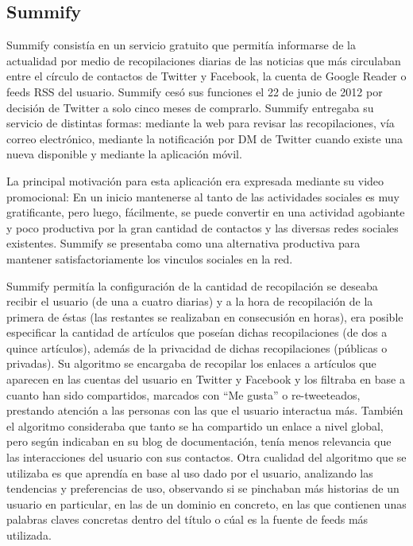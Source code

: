 \subsection{Summify}

Summify\cite{summify} consistía en un servicio gratuito que permitía informarse de la actualidad por medio de recopilaciones diarias de las noticias que más circulaban entre el círculo de contactos de Twitter y Facebook, la cuenta de Google Reader o feeds RSS del usuario. Summify cesó sus funciones el 22 de junio de 2012 por decisión de Twitter a solo cinco meses de comprarlo. Summify entregaba su servicio de distintas formas: mediante la web para revisar las recopilaciones, vía correo electrónico, mediante la notificación por DM de Twitter cuando existe una nueva disponible y mediante la aplicación móvil.

La principal motivación para esta aplicación era expresada mediante su video promocional: En un inicio mantenerse al tanto de las actividades sociales es muy gratificante, pero luego, fácilmente, se puede convertir en una actividad agobiante y poco productiva por la gran cantidad de contactos y las diversas redes sociales existentes. Summify se presentaba como una alternativa productiva para mantener satisfactoriamente los vinculos sociales en la red.

Summify permitía la configuración de la cantidad de recopilación se deseaba recibir el usuario (de una a cuatro diarias) y a la hora de recopilación de la primera de éstas (las restantes se realizaban en consecusión en horas), era posible especificar la cantidad de artículos que poseían dichas recopilaciones (de dos a quince artículos), además de la privacidad de dichas recopilaciones (públicas o privadas). Su algoritmo se encargaba de recopilar los enlaces a artículos que aparecen en las cuentas del usuario en Twitter y Facebook y los filtraba en base a cuanto han sido compartidos, marcados con “Me gusta” o re-tweeteados, prestando atención a las personas con las que el usuario interactua más. También el algoritmo consideraba que tanto se ha compartido un enlace a nivel global, pero según indicaban en su blog de documentación, tenía menos relevancia que las interacciones del usuario con sus contactos. Otra cualidad del algoritmo que se utilizaba es que aprendía en base al uso dado por el usuario, analizando las tendencias y preferencias de uso, observando si se pinchaban más historias de un usuario en particular, en las de un dominio en concreto, en las que contienen unas palabras claves concretas dentro del título o cúal es la fuente de feeds más utilizada.

